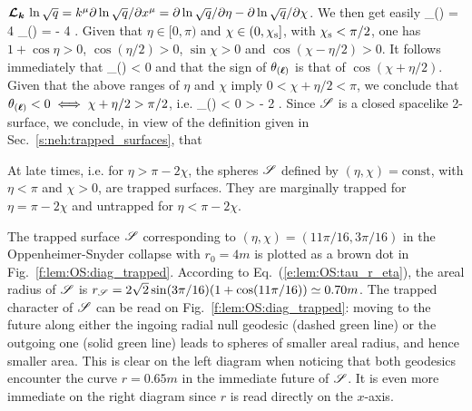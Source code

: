  $\bm{\mathcal{L}}_{\bm{\bm{k}}}\, \ln \sqrt{q} = k^\mu \partial \ln\sqrt{q} /\partial x^\mu =
 \partial \ln\sqrt{q} /\partial \eta - \partial\ln  \sqrt{q} /\partial \chi$.
We then get easily
\be
    \theta_{(\wl)} = 4 
    \qand
    \theta_{()} = - 4  .
\ee
Given that $\eta\in [0,\pi)$ %
and $\chi\in(0,\chi_{\rm s}]$, with $\chi_{\rm s} < \pi/2$,
one has $1 + \cos\eta > 0$, $\cos(\eta/2) > 0$, $\sin\chi > 0$
and $\cos(\chi - \eta/2) > 0$. It follows immediately that
\be
    \theta_{()} < 0
\ee
and that the sign of $\theta_{(\bm{\ell})}$ is that of $\cos(\chi + \eta/2)$.
Given that the above ranges of $\eta$ and $\chi$ imply $0 < \chi + \eta/2 < \pi$,
we conclude that $\theta_{(\bm{\ell})} < 0 \iff \chi + \eta/2 > \pi/2$, i.e.
\be
    \theta_{(\wl)} < 0 \iff \eta > \pi - 2 \chi .
\ee
Since $\mathscr{S}$ is a closed spacelike 2-surface,
we conclude, in view of the definition given in Sec.~\ref{s:neh:trapped_surfaces}, that
\begin{greybox}
At late times, i.e. for $\eta > \pi - 2 \chi$, the spheres $\mathscr{S}$ defined
by $(\eta,\chi) = \mathrm{const}$, with $\eta<\pi$ and $\chi>0$,
are trapped surfaces. They are marginally trapped for $\eta = \pi - 2 \chi$
and untrapped for $\eta <  \pi - 2 \chi$.
\end{greybox}

\begin{example}
The trapped surface $\mathscr{S}$ corresponding to $(\eta,\chi) = (11\pi/16, 3\pi/16)$
in the Oppen\-heimer-Snyder collapse with $r_0 = 4 m$
is plotted as a brown dot in Fig.~\ref{f:lem:OS:diag_trapped}. According
to Eq.~(\ref{e:lem:OS:tau_r_eta}), the areal radius of $\mathscr{S}$ is
$r_{\mathscr{S}} = 2\sqrt{2} \sin(3\pi/16) (1 + \cos(11\pi/16)) \simeq 0.70 m$.
The trapped character of $\mathscr{S}$ can be read on Fig.~\ref{f:lem:OS:diag_trapped}:
moving to the future along either the ingoing radial null geodesic (dashed green line)
or the outgoing one (solid green line) leads to spheres of smaller areal radius,
and hence smaller area. This is clear on the left diagram when noticing
that both geodesics encounter the curve $r=0.65 m$ in the immediate future of $\mathscr{S}$.
It is even more immediate on the right diagram since $r$ is read directly on the $x$-axis.
\end{example}

